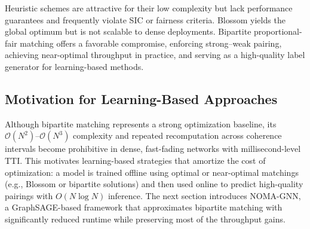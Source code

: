 Heuristic schemes are attractive for their low complexity but lack performance guarantees and frequently violate SIC or fairness criteria. Blossom yields the global optimum but is not scalable to dense deployments. Bipartite proportional-fair matching offers a favorable compromise, enforcing strong–weak pairing, achieving near-optimal throughput in practice, and serving as a high-quality label generator for learning-based methods.



\subsection{Motivation for Learning-Based Approaches}

Although bipartite matching represents a strong optimization baseline, its $\mathcal{O}(N^2)$–$\mathcal{O}(N^3)$ complexity and repeated recomputation across coherence intervals become prohibitive in dense, fast-fading networks with millisecond-level TTI. This motivates learning-based strategies that amortize the cost of optimization: a model is trained offline using optimal or near-optimal matchings (e.g., Blossom or bipartite solutions) and then used online to predict high-quality pairings with $O(N \log N)$ inference. The next section introduces NOMA-GNN, a GraphSAGE-based framework that approximates bipartite matching with significantly reduced runtime while preserving most of the throughput gains.
